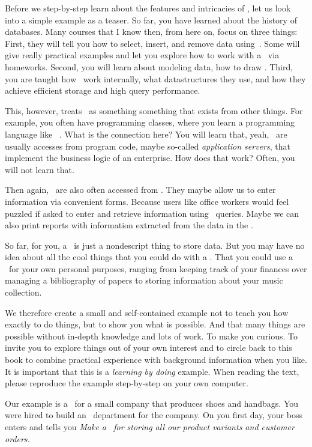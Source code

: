 Before we step-by-step learn about the features and intricacies of \dbs, let us look into a simple example as a teaser.
So far, you have learned about the history of databases.
Many courses that I know then, from here on, focus on three things:
First, they will tell you how to select, insert, and remove data using~\sql.
Some will give really practical examples and let you explore how to work with a \db\ via homeworks.
Second, you will learn about modeling data, how to draw .
Third, you are taught how \dbs\ work internally, what datastructures they use, and how they achieve efficient storage and high query performance.

This, however, treats \dbs\ as something  something that exists  from other things.
For example, you often have programming classes, where you learn a programming language like \python~\cite{programmingWithPython}.
What is the connection here?
You will learn that, yeah, \dbs\ are usually accesses from program code, maybe so-called \emph{application servers}, that implement the business logic of an enterprise.
How does that work?
Often, you will not learn that.

Then again, \dbs\ are also often accessed from .
They maybe allow us to enter information via convenient forms.
Because users like office workers would feel puzzled if asked to enter and retrieve information using \sql\ queries.
Maybe we can also print reports with information extracted from the data in the \db.

So far, for you, a \db\ is just a nondescript thing to store data.
But you may have no idea about all the cool things that you could do with a \db.
That you could use a \db\ for your own personal purposes, ranging from keeping track of your finances over managing a bibliography of papers to storing information about your music collection.

We therefore create a small and self-contained example not to teach you how exactly to do things, but to show you what is possible.
And that many things are possible without in-depth knowledge and lots of work.
To make you curious.
To invite you to explore things out of your own interest and to circle back to this book to combine practical experience with background information when you like.
It is important that this is a \emph{learning by doing} example.
When reading the text, please reproduce the example step-by-step on your own computer.

Our example is a \dbs\ for a small company that produces shoes and handbags.
You were hired to build an ~department for the company.
On you first day, your boss enters and tells you \emph{Make a \db\ for storing all our product variants and customer orders.}
